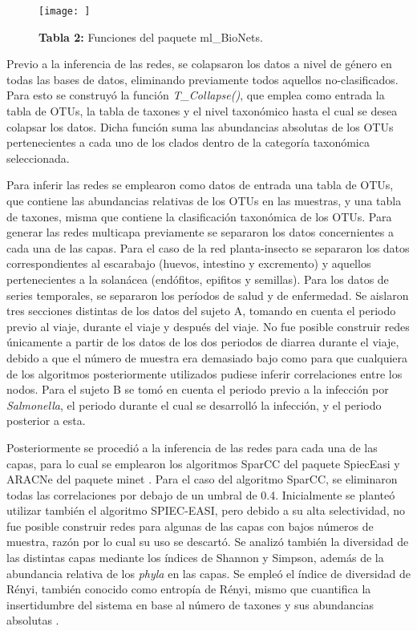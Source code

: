 \documentclass[
]{book}
\begin{document}
\begin{figure}
\centering
\texttt{[image: ]}
\caption{\textbf{Tabla 2:} Funciones del paquete ml\_BioNets.}
\end{figure}

Previo a la inferencia de las redes, se colapsaron los datos a nivel de género en todas las bases de datos, eliminando previamente todos aquellos no-clasificados. Para esto se construyó la función \emph{T\_Collapse()}, que emplea como entrada la tabla de OTUs, la tabla de taxones y el nivel taxonómico hasta el cual se desea colapsar los datos. Dicha función suma las abundancias absolutas de los OTUs pertenecientes a cada uno de los clados dentro de la categoría taxonómica seleccionada.

Para inferir las redes se emplearon como datos de entrada una tabla de OTUs, que contiene las abundancias relativas de los OTUs en las muestras, y una tabla de taxones, misma que contiene la clasificación taxonómica de los OTUs. Para generar las redes multicapa previamente se separaron los datos concernientes a cada una de las capas. Para el caso de la red planta-insecto se separaron los datos correspondientes al escarabajo (huevos, intestino y excremento) y aquellos pertenecientes a la solanácea (endófitos, epifitos y semillas). Para los datos de series temporales, se separaron los períodos de salud y de enfermedad. Se aislaron tres secciones distintas de los datos del sujeto A, tomando en cuenta el periodo previo al viaje, durante el viaje y después del viaje. No fue posible construir redes únicamente a partir de los datos de los dos periodos de diarrea durante el viaje, debido a que el número de muestra era demasiado bajo como para que cualquiera de los algoritmos posteriormente utilizados pudiese inferir correlaciones entre los nodos. Para el sujeto B se tomó en cuenta el periodo previo a la infección por \emph{Salmonella}, el periodo durante el cual se desarrolló la infección, y el periodo posterior a esta.

Posteriormente se procedió a la inferencia de las redes para cada una de las capas, para lo cual se emplearon los algoritmos SparCC del paquete SpiecEasi \citep{SpiecEasi} y ARACNe del paquete minet \citep{minet}. Para el caso del algoritmo SparCC, se eliminaron todas las correlaciones por debajo de un umbral de 0.4. Inicialmente se planteó utilizar también el algoritmo SPIEC-EASI, pero debido a su alta selectividad, no fue posible construir redes para algunas de las capas con bajos números de muestra, razón por lo cual su uso se descartó. Se analizó también la diversidad de las distintas capas mediante los índices de Shannon y Simpson, además de la abundancia relativa de los \emph{phyla} en las capas. Se empleó el índice de diversidad de Rényi, también conocido como entropía de Rényi, mismo que cuantifica la insertidumbre del sistema en base al número de taxones y sus abundancias absolutas \citep{tothmeresz1995comparison}.
\end{document}
